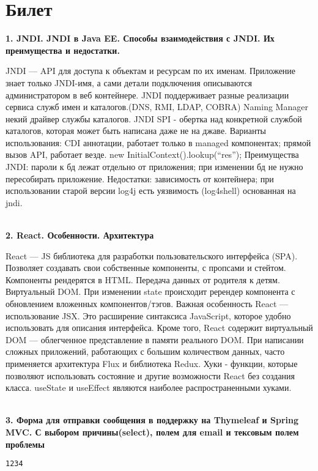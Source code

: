 \documentclass{article}
\newcommand{\bil}[5]{%
        \section{Билет}
        \textbf{1. #1}

        #4
        \\
        \textbf{2. #2}
        
        #5
        \\
        \textbf{3. #3}
}
\begin{document}
\bil{JNDI. JNDI в Java EE. Способы взаимодействия с JNDI. Их преимущества и недостатки.}{React. Особенности. Архитектура}
{Форма для отправки сообщения в поддержку на Thymeleaf и Spring MVC. С выбором причины(select), полем для email и тексовым полем проблемы}{
    JNDI — API для доступа к объектам и ресурсам по их именам.
    Приложение знает только JNDI-имя, а сами детали подключения описываются администратором в веб контейнере. 
    JNDI поддерживает разные реализации сервиса служб имен и каталогов.(DNS, RMI, LDAP, COBRA)
    Naming Manager некий драйвер службы каталогов. JNDI SPI - обертка над конкретной службой каталогов, которая может быть написана даже не на джаве.
    Варианты использования: CDI аннотации, работает только в managed компонентах; прямой вызов API, работает везде. new InitialContext().lookup(“res”);
    Преимущества JNDI: пароли к бд лежат отдельно от приложения; при изменении бд не нужно пересобирать приложение. Недостатки: зависимость от контейнера; при использовании старой версии log4j есть уязвимость (log4shell) основанная на jndi.
}{
    React — JS библиотека для разработки пользовательского интерфейса (SPA).
    Позволяет создавать свои собственные компоненты, с пропсами и стейтом. 
    Компоненты рендерятся в HTML. Передача данных от родителя к детям. 
    Виртуальный DOM. При изменении state происходит ререндер компонента с обновлением вложенных компонентов/тэгов. 
    Важная особенность React — использование JSX. Это расширение синтаксиса JavaScript, которое удобно использовать для описания интерфейса. 
    Кроме того, React содержит виртуальный DOM — облегченное представление в памяти реального DOM. 
    При написании сложных приложений, работающих с большим количеством данных, часто применяется архитектура Flux и библиотека Redux.
    Хуки - функции, которые позволяют использовать состояние и другие возможности React без создания класса. useState и useEffect являются наиболее распространенными хуками.
}
\begin{lstlisting}[frame=single, basicstyle=\ttfamily, breaklines=true, breakatwhitespace=true, postbreak=\mbox{\textcolor{red}{$\hookrightarrow$}\space}]
1234
\end{lstlisting}
\end{document}
